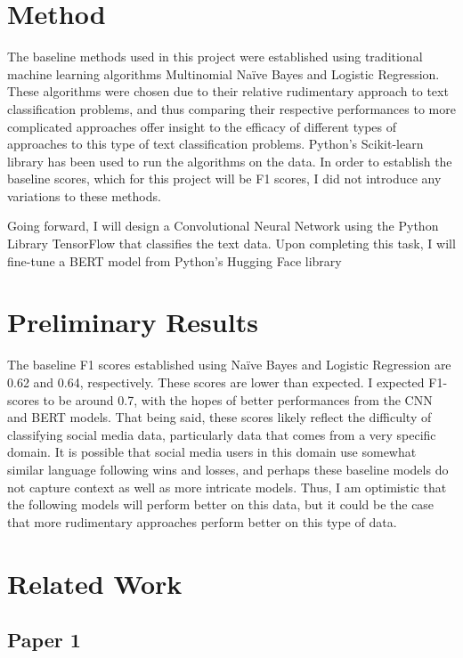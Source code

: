 \documentclass[11pt,a4paper]{article}
\begin{document}
\section{Method}

The baseline methods used in this project were established using traditional machine learning algorithms Multinomial Naïve Bayes and Logistic Regression. These algorithms were chosen due to their relative rudimentary approach to text classification problems, and thus comparing their respective performances to more complicated approaches offer insight to the efficacy of different types of approaches to this type of text classification problems. Python’s Scikit-learn library has been used to run the algorithms on the data. In order to establish the baseline scores, which for this project will be F1 scores, I did not introduce any variations to these methods. 


Going forward, I will design a Convolutional Neural Network using the Python Library TensorFlow that classifies the text data. Upon completing this task, I will fine-tune a BERT model from Python's Hugging Face library

\section{Preliminary Results}

The baseline F1 scores established using Naïve Bayes and Logistic Regression are 0.62 and 0.64, respectively. These scores are lower than expected. I expected F1-scores to be around 0.7, with the hopes of better performances from the CNN and BERT models. That being said, these scores likely reflect the difficulty of classifying social media data, particularly data that comes from a very specific domain. It is possible that social media users in this domain use somewhat similar language following wins and losses, and perhaps these baseline models do not capture context as well as more intricate models. Thus, I am optimistic that the following models will perform better on this data, but it could be the case that more rudimentary approaches perform better on this type of data.

\section{Related Work}

\subsection{Paper 1}
\end{document}
